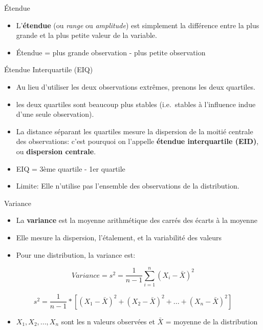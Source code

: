 \documentclass[
  ignorenonframetext,
]{beamer}
\providecommand{\tightlist}{%
  \setlength{\itemsep}{0pt}\setlength{\parskip}{0pt}}
\begin{document}
\begin{frame}{Étendue}
\protect\hypertarget{uxe9tendue}{}
\begin{itemize}
\item
  L'\textbf{étendue} (ou \emph{range} ou \emph{amplitude}) est
  simplement la différence entre la plus grande et la plus petite valeur
  de la variable.
\item
  Étendue = plus grande observation - plus petite observation
\end{itemize}
\end{frame}

\begin{frame}{Étendue Interquartile (EIQ)}
\protect\hypertarget{uxe9tendue-interquartile-eiq}{}
\begin{itemize}
\item
  Au lieu d'utiliser les deux observations extrêmes, prenons les deux
  quartiles.
\item
  les deux quartiles sont beaucoup plus stables (i.e.~stables à
  l'influence indue d'une seule observation).
\item
  La distance séparant les quartiles mesure la dispersion de la moitié
  centrale des observations: c'est pourquoi on l'appelle \textbf{étendue
  interquartile (EID)}, ou \textbf{dispersion centrale}.
\item
  EIQ = 3ème quartile - 1er quartile
\item
  Limite: Elle n'utilise pas l'ensemble des observations de la
  distribution.
\end{itemize}
\end{frame}

\begin{frame}{Variance}
\protect\hypertarget{variance}{}
\begin{itemize}
\tightlist
\item
  La \textbf{variance} est la moyenne arithmétique des carrés des écarts
  à la moyenne
\item
  Elle mesure la dispersion, l'étalement, et la variabilité des valeurs
\item
  Pour une distribution, la variance est:
\end{itemize}

\[Variance = s^2 = \frac{1}{n-1} \sum_{i=1}^n (X_i - \bar{X})^2\]

\[s^2 = \frac{1}{n-1} *[(X_1 - \bar{X})^2 + (X_2 - \bar{X})^2 + ... + (X_n - \bar{X})^2]\]

\begin{itemize}
\tightlist
\item
  \(X_1, X_2, ... , X_n\) sont les n valeurs observées et \(\bar{X}\) =
  moyenne de la distribution
\end{itemize}
\end{frame}
\end{document}
